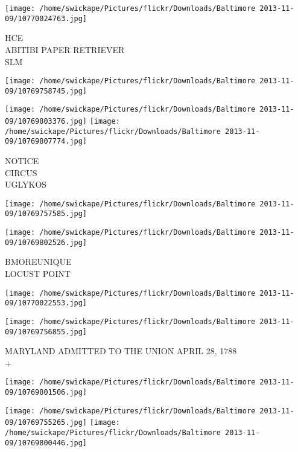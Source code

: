 \documentclass[10pt,letterpaper]{article}
\begin{document}
\vspace{0.25in}
\texttt{[image: /home/swickape/Pictures/flickr/Downloads/Baltimore 2013-11-09/10770024763.jpg]}

HCE\\
ABITIBI PAPER RETRIEVER\\
SLM\\
\pagebreak

\texttt{[image: /home/swickape/Pictures/flickr/Downloads/Baltimore 2013-11-09/10769758745.jpg]}

\vspace{0.25in}
\texttt{[image: /home/swickape/Pictures/flickr/Downloads/Baltimore 2013-11-09/10769803376.jpg]}
\texttt{[image: /home/swickape/Pictures/flickr/Downloads/Baltimore 2013-11-09/10769807774.jpg]}

NOTICE\\
CIRCUS\\
UGLYKOS\\
\pagebreak

\texttt{[image: /home/swickape/Pictures/flickr/Downloads/Baltimore 2013-11-09/10769757585.jpg]}

\vspace{0.25in}
\texttt{[image: /home/swickape/Pictures/flickr/Downloads/Baltimore 2013-11-09/10769802526.jpg]}

BMOREUNIQUE\\
LOCUST POINT\\
\pagebreak

\texttt{[image: /home/swickape/Pictures/flickr/Downloads/Baltimore 2013-11-09/10770022553.jpg]}

\vspace{0.25in}
\texttt{[image: /home/swickape/Pictures/flickr/Downloads/Baltimore 2013-11-09/10769756855.jpg]}

MARYLAND ADMITTED TO THE UNION APRIL 28, 1788\\
+\\
\pagebreak

\texttt{[image: /home/swickape/Pictures/flickr/Downloads/Baltimore 2013-11-09/10769801506.jpg]}

\vspace{0.25in}
\texttt{[image: /home/swickape/Pictures/flickr/Downloads/Baltimore 2013-11-09/10769755265.jpg]}
\texttt{[image: /home/swickape/Pictures/flickr/Downloads/Baltimore 2013-11-09/10769800446.jpg]}
\end{document}
